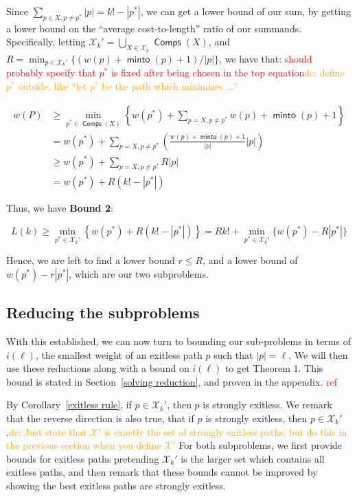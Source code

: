 \documentclass{article}
\theoremstyle{definition}
\DeclareMathOperator{\minto}{\bm{\mathsf{minto}}}
\DeclareMathOperator{\Comp}{\bm{\mathsf{Comps}}}
\newcommand{\edit}[1]{\textcolor{red}{#1}}
\newcommand{\dc}[1]{\textcolor{orange}{dc: #1}}
\begin{document}
Since $\displaystyle \sum_{p \in X, p \neq p^*} |p| = k!-|p^*|$, we can get a lower bound of our sum, by getting a lower bound on the  ``average cost-to-length'' ratio of our summands. Specifically, letting $\displaystyle \mathcal{X}_k' = \bigcup_{X \in \mathcal{X}_k} \Comp(X)$, and $\displaystyle  R = \min_{p \in \mathcal{X}_k'}\{(w(p)+\minto(p)+1)/|p|\}$, we have that:\edit{ should probably specify that $p^*$ is fixed after being chosen in the top equation}\dc{ define $p^*$ outside, like ``let $p^*$ be the path which minimizes ...''}

\begin{align*}
    w(P)  &\geq \min_{p^* \in \Comp(X)}\left\{ w(p^*) + \sum_{p = X, p \neq p^*} w(p)+\minto(p)+1\right\}\\
    &= w(p^*) + \sum_{p = X, p \neq p^*} \left(\frac{w(p)+\minto(p)+1}{|p|}|p|\right)\\
    &\geq w(p^*) + \sum_{p = X, p \neq p^*} R |p|\\ 
    &= w(p^*) + R(k!-|p^*|)
\end{align*}

Thus, we have \textbf{Bound 2}:

\[ L(k) \geq \min_{p^* \in \mathcal{X}_k'}\left\{w(p^*) + R(k!-|p^*|) \right\} = Rk! + \min_{p^* \in \mathcal{X}_k'}\{w(p^*)-R|p^*|\} \]

Hence, we are left to find a lower bound $r \leq R$, and a lower bound of $w(p^*) - r|p^*|$, which are our two subproblems.

\subsection{Reducing the subproblems} \label{reducing subproblems}

With this established, we can now turn to bounding our sub-problems in terms of $i(\ell)$, the smallest weight of an exitless path $p$ such that $|p|= \ell$. We will then use these reductions along with a bound on $i(\ell)$ to get Theorem 1. This bound is stated in Section~\ref{solving reduction}, and proven in the appendix.\edit{ ref}

By Corollary~\ref{exitless rule}, if $p \in \mathcal{X}_k'$, then $p$ is strongly exitless. We remark that the reverse direction is also true, that if $p$ is strongly exitless, then $p \in \mathcal{X}_k'$.\dc{ Just state that $\mathcal{X}'$ is exactly the set of strongly exitless paths, but do this in the previous section when you define $\mathcal{X}'$} For both subproblems, we first provide bounds for exitless paths pretending $\mathcal{X}_k'$ is the larger set which contains all exitless paths, and then remark that these bounds cannot be improved by showing the best exitless paths are strongly exitless.
\end{document}

